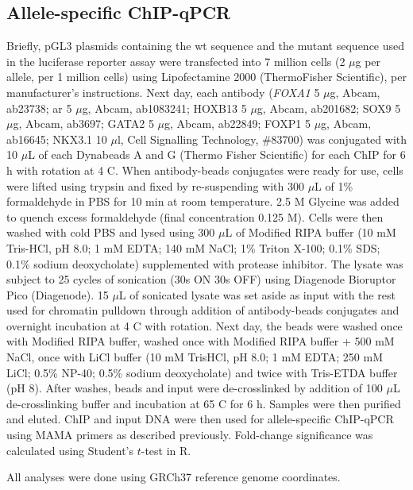 \subsection{Allele-specific ChIP-qPCR}

Briefly, pGL3 plasmids containing the \gls{wt} sequence and the mutant sequence used in the luciferase reporter assay were transfected into 7 million cells (2 $\mu$g per allele, per 1 million cells) using Lipofectamine 2000 (ThermoFisher Scientific), per manufacturer's instructions.
Next day, each antibody (\emph{FOXA1} 5 $\mu$g, Abcam, ab23738; \gls{ar} 5 $\mu$g, Abcam, ab1083241; HOXB13 5 $\mu$g, Abcam, ab201682; SOX9 5 $\mu$g, Abcam, ab3697; GATA2 5 $\mu$g, Abcam, ab22849; FOXP1 5 $\mu$g, Abcam, ab16645; NKX3.1 10 $\mu$l, Cell Signalling Technology, \#83700) was conjugated with 10 $\mu$L of each Dynabeads A and G (Thermo Fisher Scientific) for each ChIP for 6 h with rotation at 4 \textdegree C.
When antibody-beads conjugates were ready for use, cells were lifted using trypsin and fixed by re-suspending with 300 $\mu$L of 1\% formaldehyde in PBS for 10 min at room temperature.
2.5 M Glycine was added to quench excess formaldehyde (final concentration 0.125 M).
Cells were then washed with cold PBS and lysed using 300 $\mu$L of Modified RIPA buffer (10 mM Tris-HCl, pH 8.0; 1 mM EDTA; 140 mM NaCl; 1\% Triton X-100; 0.1\% SDS; 0.1\% sodium deoxycholate) supplemented with protease inhibitor.
The lysate was subject to 25 cycles of sonication (30s ON 30s OFF) using Diagenode Bioruptor Pico (Diagenode).
15 $\mu$L of sonicated lysate was set aside as input with the rest used for chromatin pulldown through addition of antibody-beads conjugates and overnight incubation at 4 \textdegree C with rotation.
Next day, the beads were washed once with Modified RIPA buffer, washed once with Modified RIPA buffer + 500 mM NaCl, once with LiCl buffer (10 mM TrisHCl, pH 8.0; 1 mM EDTA; 250 mM LiCl; 0.5\% NP-40; 0.5\% sodium deoxycholate) and twice with Tris-ETDA buffer (pH 8).
After washes, beads and input were de-crosslinked by addition of 100 $\mu$L de-crosslinking buffer and incubation at 65 \textdegree C for 6 h.
Samples were then purified and eluted.
ChIP and input DNA were then used for allele-specific ChIP-qPCR using MAMA primers as described previously.
Fold-change significance was calculated using Student's $t$-test in R.

All analyses were done using GRCh37 \cite{internationalhumangenomesequencingconsortiumFinishingEuchromaticSequence2004} reference genome coordinates.
